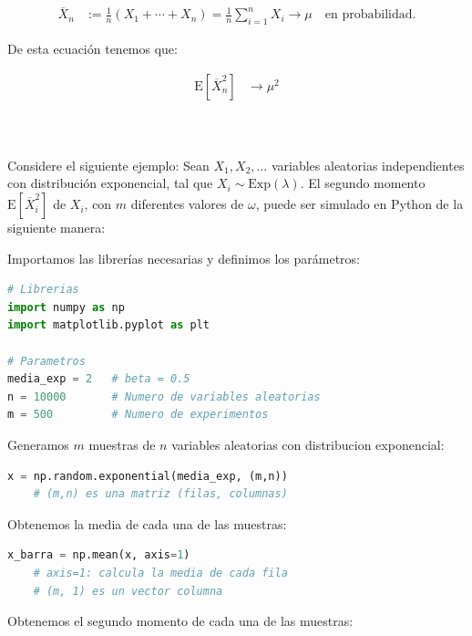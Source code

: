 \documentclass[8pt]{article}
\begin{document}
\begin{align*}
    \overline{X}_n &:= \frac{1}{n}(X_1 + \cdots + X_n) = \frac{1}{n}\sum_{i=1}^n X_i \longrightarrow \mu \quad \text{en probabilidad}.
\end{align*}

De esta ecuación tenemos que:

\begin{align*}
    \text{E}[\overline{X}^2_n] &\rightarrow \mu^2 \\
\end{align*}


 \\\\

Considere el siguiente ejemplo: Sean $X_1, X_2, \ldots$ variables aleatorias independientes con distribución exponencial, tal que $X_i \sim \text{Exp}(\lambda)$. El segundo momento $\text{E}[\overline{X}^2_i]$ de $X_i$, con $m$ diferentes valores de $\omega$, puede ser simulado en Python de la siguiente manera:

\vspace*{0.3cm}

Importamos las librerías necesarias y definimos los parámetros:

\begin{lstlisting}[language=Python]
# Librerias
import numpy as np
import matplotlib.pyplot as plt

# Parametros
media_exp = 2   # beta = 0.5
n = 10000       # Numero de variables aleatorias
m = 500         # Numero de experimentos
\end{lstlisting}

Generamos $m$ muestras de $n$ variables aleatorias con distribucion exponencial:

\begin{lstlisting}[language=Python]
x = np.random.exponential(media_exp, (m,n))
    # (m,n) es una matriz (filas, columnas)
\end{lstlisting}

Obtenemos la media de cada una de las muestras:

\begin{lstlisting}[language=Python]
x_barra = np.mean(x, axis=1)
    # axis=1: calcula la media de cada fila
    # (m, 1) es un vector columna
\end{lstlisting}

Obtenemos el segundo momento de cada una de las muestras:
\end{document}
